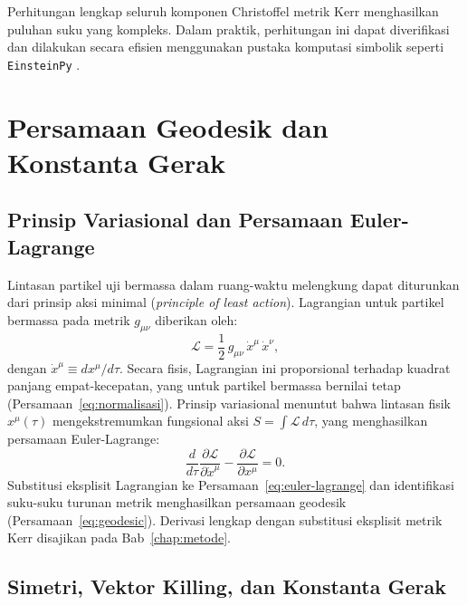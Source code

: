Perhitungan lengkap seluruh komponen Christoffel metrik Kerr menghasilkan puluhan suku yang kompleks. Dalam praktik, perhitungan ini dapat diverifikasi dan dilakukan secara efisien menggunakan pustaka komputasi simbolik seperti \texttt{EinsteinPy} \parencite{Bapat2020EinsteinPy}.


\section{Persamaan Geodesik dan Konstanta Gerak}
\label{sec:persamaan-geodesik}

\subsection{Prinsip Variasional dan Persamaan Euler-Lagrange}
\label{subsec:variasional-geodesik}

Lintasan partikel uji bermassa dalam ruang-waktu melengkung dapat diturunkan dari prinsip aksi minimal (\textit{principle of least action}). Lagrangian untuk partikel bermassa pada metrik $g_{\mu\nu}$ diberikan oleh:
\begin{equation}
    \mathcal{L} = \frac{1}{2}\, g_{\mu\nu}\, \dot{x}^\mu\, \dot{x}^\nu,
    \label{eq:lagrangian}
\end{equation}
dengan $\dot{x}^\mu \equiv dx^\mu/d\tau$. Secara fisis, Lagrangian ini proporsional terhadap kuadrat panjang empat-kecepatan, yang untuk partikel bermassa bernilai tetap (Persamaan~\ref{eq:normalisasi}). Prinsip variasional menuntut bahwa lintasan fisik $x^\mu(\tau)$ mengekstremumkan fungsional aksi $S = \int \mathcal{L}\, d\tau$, yang menghasilkan persamaan Euler-Lagrange:
\begin{equation}
    \frac{d}{d\tau}\frac{\partial\mathcal{L}}{\partial\dot{x}^\mu}
    - \frac{\partial\mathcal{L}}{\partial x^\mu} = 0.
    \label{eq:euler-lagrange}
\end{equation}
Substitusi eksplisit Lagrangian ke Persamaan~\eqref{eq:euler-lagrange} dan identifikasi suku-suku turunan metrik menghasilkan persamaan geodesik (Persamaan~\ref{eq:geodesic}). Derivasi lengkap dengan substitusi eksplisit metrik Kerr disajikan pada Bab~\ref{chap:metode}.

\subsection{Simetri, Vektor Killing, dan Konstanta Gerak}
\label{subsec:killing-konstanta}

